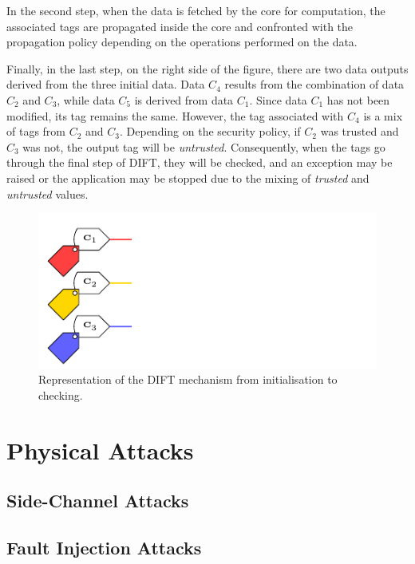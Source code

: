 In the second step, when the data is fetched by the core for computation, the associated tags are propagated inside the core and confronted with the propagation policy depending on the operations performed on the data.

Finally, in the last step, on the right side of the figure, there are two data outputs derived from the three initial data. Data $C_4$ results from the combination of data $C_2$ and $C_3$, while data $C_5$ is derived from data $C_1$. Since data $C_1$ has not been modified, its tag remains the same. However, the tag associated with $C_4$ is a mix of tags from $C_2$ and $C_3$. Depending on the security policy, if $C_2$ was trusted and $C_3$ was not, the output tag will be \textit{untrusted}. Consequently, when the tags go through the final step of DIFT, they will be checked, and an exception may be raised or the application may be stopped due to the mixing of \textit{trusted} and \textit{untrusted} values.

\begin{figure}[ht]
    \centering
    \includegraphics[page=3]{c2_soa/img/schemaDIFT.pdf}
    \caption{Representation of the DIFT mechanism from initialisation to checking.}
    \label{fig:dift_init}
\end{figure}

\section{Physical Attacks}
\label{section:physicalAttacks}

\subsection{Side-Channel Attacks}
\subsection{Fault Injection Attacks}
\cite{BCNTW-06-procieee}

